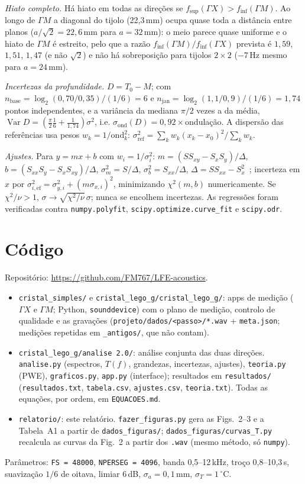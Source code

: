\documentclass[10pt,twocolumn,a4paper]{article}
\newcommand{\GX}{\Gamma X}
\newcommand{\GM}{\Gamma M}
\newcommand{\finf}{f_\text{inf}}
\newcommand{\fsup}{f_\text{sup}}
\begin{document}
\emph{Hiato completo.} Há hiato em todas as direções se $\fsup(\GX)>\finf(\GM)$. Ao longo de $\GM$ a diagonal
do tijolo (22,3\,mm) ocupa quase toda a distância entre planos ($a/\sqrt2=22{,}6$\,mm para $a=32$\,mm): o meio
parece quase uniforme e o hiato de $\GM$ é estreito, pelo que a razão $\finf(\GM)/\finf(\GX)$ prevista é
$1{,}59$, $1{,}51$, $1{,}47$ (e não $\sqrt2$) e não há sobreposição para tijolos $2{\times}2$
(${-}7$\,Hz mesmo para $a=24$\,mm).

\emph{Incertezas da profundidade.} $D=T_0-M$; com $n_\text{base}=\log_2(0{,}70/0{,}35)/(1/6)=6$ e
$n_\text{jan}=\log_2(1{,}1/0{,}9)/(1/6)=1{,}74$ pontos independentes, e a variância da mediana $\pi/2$ vezes a
da média, $\operatorname{Var}D=(\tfrac{\pi}{2}\tfrac16+\tfrac{1}{1{,}74})\sigma^2$, i.e.
$\sigma_\text{ond}(D)=0{,}92\times$ondulação. A dispersão das referências usa pesos
$w_k=1/\text{ond}_k^2$: $\sigma_\text{ref}^2=\sum_kw_k(x_k-x_0)^2/\sum_kw_k$.

\emph{Ajustes.} Para $y=mx+b$ com $w_i=1/\sigma_i^2$:
$m=(SS_{xy}-S_xS_y)/\Delta$, $b=(S_{xx}S_y-S_xS_{xy})/\Delta$, $\sigma_m^2=S/\Delta$, $\sigma_b^2=S_{xx}/\Delta$,
$\Delta=SS_{xx}-S_x^2$~\cite{bevington}; incerteza em $x$ por $\sigma_{i,\text{ef}}^2=\sigma_{y,i}^2+(m\sigma_{x,i})^2$,
minimizando $\chi^2(m,b)$ numericamente. Se $\chi^2/\nu>1$, $\sigma\to\sqrt{\chi^2/\nu}\,\sigma$; nunca se
encolhem incertezas. As regressões foram verificadas contra \texttt{numpy.polyfit},
\texttt{scipy.optimize.curve\_fit} e \texttt{scipy.odr}.

\section{Código}
Repositório: \url{https://github.com/FM767/LFE-acoustics}.
\begin{itemize}[nosep,leftmargin=1.2em]
  \item \texttt{cristal\_simples/} e \texttt{cristal\_lego\_g/cristal\_lego\_g/}: apps de medição ($\GX$ e $\GM$;
  Python, \texttt{sounddevice}) com o plano de medição, controlo de qualidade e as gravações
  (\texttt{projeto/dados/<passo>/*.wav} + \texttt{meta.json}; medições repetidas em \texttt{\_antigos/}, que não contam).
  \item \texttt{cristal\_lego\_g/analise 2.0/}: análise conjunta das duas direções.
  \texttt{analise.py} (espectros, $T(f)$, grandezas, incertezas, ajustes), \texttt{teoria.py} (PWE),
  \texttt{graficos.py}, \texttt{app.py} (interface); resultados em \texttt{resultados/}
  (\texttt{resultados.txt}, \texttt{tabela.csv}, \texttt{ajustes.csv}, \texttt{teoria.txt}).
  Todas as equações, por ordem, em \texttt{EQUACOES.md}.
  \item \texttt{relatorio/}: este relatório. \texttt{fazer\_figuras.py} gera as Figs.~2--3 e a
  Tabela~A1 a partir de \texttt{dados\_figuras/}; \texttt{dados\_figuras/curvas\_T.py} recalcula as curvas
  da Fig.~2 a partir dos \texttt{.wav} (mesmo método, só \texttt{numpy}).
\end{itemize}
Parâmetros: \texttt{FS = 48000}, \texttt{NPERSEG = 4096}, banda 0,5--12\,kHz, troço 0,8--10,3\,s,
suavização $1/6$ de oitava, limiar 6\,dB, $\sigma_a=0{,}1$\,mm, $\sigma_T=1\,^\circ$C.
\end{document}
